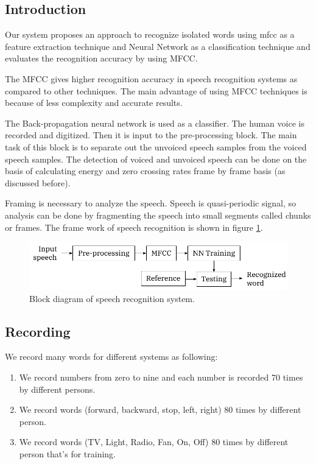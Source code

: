 \documentclass[12pt, a4paper, twoside]{report}
\begin{document}
\subsection{Introduction}
Our system proposes an approach to recognize isolated words using \acrshort{mfcc} as a feature extraction technique and Neural Network as a classification technique and evaluates the recognition accuracy by using MFCC.
\par
The MFCC gives higher recognition accuracy in speech recognition systems as compared to other techniques. The main advantage of using MFCC techniques is because of less complexity and accurate results.
\par
The Back-propagation neural network is used as a classifier. The human voice is recorded and digitized. Then it is input to the pre-processing block. The main task of this block is to separate out the unvoiced speech samples from the voiced speech samples. The detection of voiced and unvoiced speech can be done on the basis of calculating energy and zero crossing rates frame by frame basis (as discussed before). 
\par
Framing is necessary to analyze the speech. Speech is quasi-periodic signal, so analysis can be done by fragmenting the speech into small segments called chunks or frames. The frame work of speech recognition is shown in figure \ref{fig:nn-framework}.
\begin{figure}[!h]
	\centering
	\includegraphics[]
	{images/chapter5/nn-framework}
	\caption{Block diagram of speech recognition system.}
	\label{fig:nn-framework}
\end{figure}

\subsection{Recording}
We record many words for different systems as following:
\begin{enumerate}
\item We record numbers from zero to nine and each number is recorded 70 times by different persons. 
\item We record words (forward, backward, stop, left, right) 80 times by different person.
\item We record words (TV, Light, Radio, Fan, On, Off) 80 times by different person that's for training.
\end{enumerate}
\end{document}
